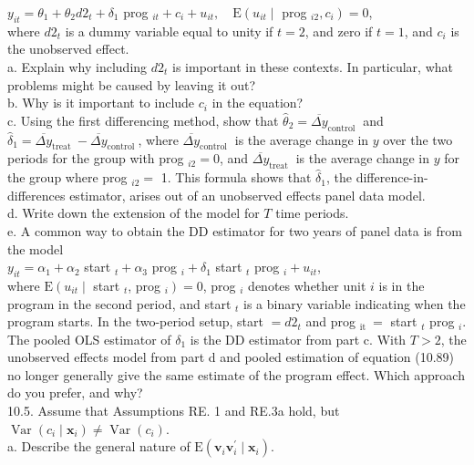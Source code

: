 \documentclass[10pt]{article}
\begin{document}
$y_{i t}=\theta_{1}+\theta_{2} d 2_{t}+\delta_{1}$ prog $_{i t}+c_{i}+u_{i t}, \quad \mathrm{E}\left(u_{i t} \mid\right.$ prog $\left._{i 2}, c_{i}\right)=0$,\\
where $d 2_{t}$ is a dummy variable equal to unity if $t=2$, and zero if $t=1$, and $c_{i}$ is the unobserved effect.\\
a. Explain why including $d 2_{t}$ is important in these contexts. In particular, what problems might be caused by leaving it out?\\
b. Why is it important to include $c_{i}$ in the equation?\\
c. Using the first differencing method, show that $\hat{\theta}_{2}=\overline{\Delta y}_{\text {control }}$ and $\hat{\delta}_{1}=\overline{\Delta y}_{\text {treat }}- \overline{\Delta y}_{\text {control }}$, where $\overline{\Delta y}_{\text {control }}$ is the average change in $y$ over the two periods for the group with prog $_{i 2}=0$, and $\overline{\Delta y}_{\text {treat }}$ is the average change in $y$ for the group where prog $_{i 2}=$ 1. This formula shows that $\hat{\delta}_{1}$, the difference-in-differences estimator, arises out of an unobserved effects panel data model.\\
d. Write down the extension of the model for $T$ time periods.\\
e. A common way to obtain the DD estimator for two years of panel data is from the model\\
$y_{i t}=\alpha_{1}+\alpha_{2}$ start $_{t}+\alpha_{3}$ prog $_{i}+\delta_{1}$ start $_{t}$ prog $_{i}+u_{i t}$,\\
where $\mathrm{E}\left(u_{i t} \mid\right.$ start $_{t}$, prog $\left._{i}\right)=0$, prog $_{i}$ denotes whether unit $i$ is in the program in the second period, and start ${ }_{t}$ is a binary variable indicating when the program starts. In the two-period setup, start $=d 2_{t}$ and prog ${ }_{\text {it }}=$ start $_{t}$ prog $_{i}$. The pooled OLS estimator of $\delta_{1}$ is the DD estimator from part c. With $T>2$, the unobserved effects model from part d and pooled estimation of equation (10.89) no longer generally give the same estimate of the program effect. Which approach do you prefer, and why?\\
10.5. Assume that Assumptions RE. 1 and RE.3a hold, but $\operatorname{Var}\left(c_{i} \mid \mathbf{x}_{i}\right) \neq \operatorname{Var}\left(c_{i}\right)$.\\
a. Describe the general nature of $\mathrm{E}\left(\mathbf{v}_{i} \mathbf{v}_{i}^{\prime} \mid \mathbf{x}_{i}\right)$.\\
\end{document}
